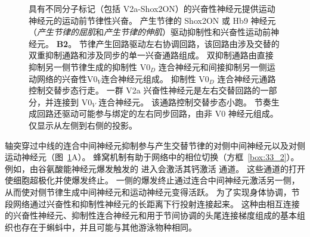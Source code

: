 \begin{figure}[htbp]
{	具有不同分子标记（包括 V2a-Shox2ON）的兴奋性神经元提供运动神经元的运动前节律性兴奋。
	产生节律的 Shox2ON 或 Hb9 神经元（\textit{产生节律的屈肌}和\textit{产生节律的伸肌}）驱动抑制性和兴奋性运动前神经元。\cite{kiehn2016decoding}
	\textbf{B2}。 节律产生回路驱动左右协调回路，该回路由涉及交替的双重抑制通路和涉及同步的单一兴奋通路组成。
	双抑制通路由直接抑制另一侧节律生成的抑制性 V0$_D$ 连合神经元和间接抑制另一侧运动网络的兴奋性V0$_V$连合神经元组成。
	抑制性 V0$_D$ 连合神经元通路控制交替步态行走。
	一群 V2a 兴奋性神经元是左右交替回路的一部分，并连接到 V0$_V$ 连合神经元。
	该通路控制交替步态小跑。
	节奏生成回路还驱动可能参与绑定的左右同步回路，由非 V0 神经元组成。
	仅显示从左侧到右侧的投影\cite{kiehn2016decoding}。}
	\label{fig:33_7}
\end{figure}


轴突穿过中线的连合中间神经元抑制参与产生交替节律的对侧中间神经元以及对侧运动神经元（图~\ref{fig:33_7}A）。
蜂窝机制有助于网络中的相位切换（方框~\ref{box:33_2}）。
例如，由谷氨酸能神经元爆发触发的  进入会激活其钙激活  通道。
这些通道的打开使细胞超极化并使爆发终止。
一侧的爆发终止通过连合中间神经元激活另一侧，从而使对侧节律生成中间神经元和运动神经元变得活跃。
为了实现身体协调，节段网络通过兴奋性和抑制性神经元的长距离下行投射连接起来。
这种由相互连接的兴奋性神经元、抑制性连合神经元和用于节间协调的头尾连接梯度组成的基本组织也存在于蝌蚪中，并且可能与其他游泳物种相同。


